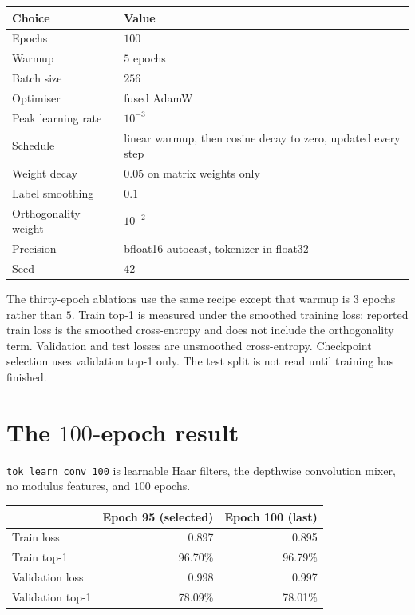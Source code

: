\documentclass[11pt]{article}
\begin{document}
\begin{center}
\begin{tabular}{@{}ll@{}}
\toprule
Choice & Value \\
\midrule
Epochs & $100$ \\
Warmup & $5$ epochs \\
Batch size & $256$ \\
Optimiser & fused AdamW \\
Peak learning rate & $10^{-3}$ \\
Schedule & linear warmup, then cosine decay to zero, updated every step \\
Weight decay & $0.05$ on matrix weights only \\
Label smoothing & $0.1$ \\
Orthogonality weight & $10^{-2}$ \\
Precision & bfloat16 autocast, tokenizer in float32 \\
Seed & $42$ \\
\bottomrule
\end{tabular}
\end{center}

The thirty-epoch ablations use the same recipe except that warmup is $3$
epochs rather than $5$. Train top-1 is measured under the smoothed training
loss; reported train loss is the smoothed cross-entropy and does not include
the orthogonality term. Validation and test losses are unsmoothed
cross-entropy. Checkpoint selection uses validation top-1 only. The test split
is not read until training has finished.

\section{The $100$-epoch result}

\texttt{tok\_learn\_conv\_100} is learnable Haar filters, the depthwise
convolution mixer, no modulus features, and $100$ epochs.

\begin{center}
\begin{tabular}{@{}lrr@{}}
\toprule
 & Epoch 95 (selected) & Epoch 100 (last) \\
\midrule
Train loss & 0.897 & 0.895 \\
Train top-1 & 96.70\% & 96.79\% \\
Validation loss & 0.998 & 0.997 \\
Validation top-1 & 78.09\% & 78.01\% \\
\bottomrule
\end{tabular}
\end{center}
\end{document}
